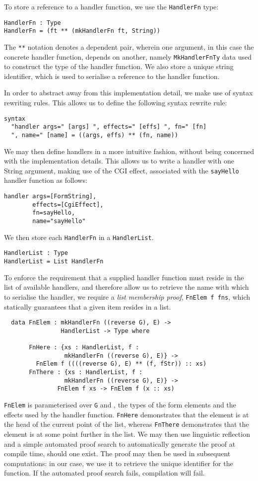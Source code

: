 \documentclass[preprint]{sigplanconf}
\begin{document}
To store a reference to a handler function, we use the \texttt{HandlerFn} type:
\begin{Verbatim}
HandlerFn : Type
HandlerFn = (ft ** (mkHandlerFn ft, String))
\end{Verbatim}
%
The \texttt{**} notation denotes a dependent pair, wherein one argument, in this case the concrete handler function, depends on another, namely \texttt{MkHandlerFnTy} data used to construct the type of the handler function. We also store a unique string identifier, which is used to serialise a reference to the handler function. 

In order to abstract away from this implementation detail, we make use of \idris{} syntax rewriting rules. This allows us to define the following syntax rewrite rule:
\begin{Verbatim}
syntax 
  "handler args=" [args] ", effects=" [effs] ", fn=" [fn] 
  ", name=" [name] = ((args, effs) ** (fn, name))
\end{Verbatim}
We may then define handlers in a more intuitive fashion, without being concerned with the implementation details. This allows us to write a handler with one String argument, making use of the CGI effect, associated with the \texttt{sayHello} handler function as follows:
\begin{Verbatim}
handler args=[FormString], 
        effects=[CgiEffect], 
        fn=sayHello, 
        name="sayHello"
\end{Verbatim}


We then store each \texttt{HandlerFn} in a \texttt{HandlerList}.
\begin{Verbatim}
HandlerList : Type
HandlerList = List HandlerFn
\end{Verbatim}
To enforce the requirement that a supplied handler function must reside in the list of available handlers, and therefore allow us to retrieve the name with which to serialise the handler, we require a \textit{list membership proof},  \texttt{FnElem f fns}, which statically guarantees that a given item resides in a list.
\begin{Verbatim}
  data FnElem : mkHandlerFn ((reverse G), E) -> 
                HandlerList -> Type where
                
       FnHere : {xs : HandlerList, f : 
                 mkHandlerFn ((reverse G), E)} ->
         FnElem f ((((reverse G), E) ** (f, fStr)) :: xs)
       FnThere : {xs : HandlerList, f : 
                 mkHandlerFn ((reverse G), E)} ->
               FnElem f xs -> FnElem f (x :: xs)
\end{Verbatim}
\texttt{FnElem} is parameterised over \texttt{G} and , the types of the form elements and the effects used by the handler function. \texttt{FnHere} demonstrates that the element is at the head of the current point of the list, whereas \texttt{FnThere} demonstrates that the element is at some point further in the list. %
We may then use linguistic reflection and a simple automated proof search to automatically generate the proof at compile time, should one exist. The proof may then be used in subsequent computations: in our case, we use it to retrieve the unique identifier for the function. If the automated proof search fails, compilation will fail.
\end{document}
